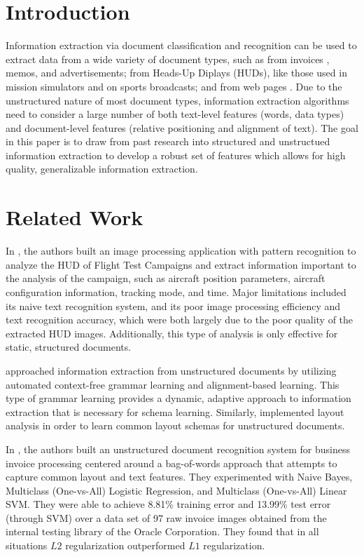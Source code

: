 \documentclass[twoside,11pt]{article}
\renewcommand{\>}{{\rightarrow}}
\newcommand{\1}{{\mathbf 1}}
\newcommand{\0}{{\mathbf 0}}
\begin{document}

\section{Introduction}
Information extraction via document classification and recognition can be used to extract data from a wide variety of document types, such as from invoices \cite{LiuWanZhang2016}, memos, and advertisements; from Heads-Up Diplays (HUDs), like those used in mission simulators \cite{Guarino2013} and on sports broadcasts; and from web pages \cite{Gogar2016}. Due to the unstructured nature of most document types, information extraction algorithms need to consider a large number of both text-level features (words, data types) and document-level features (relative positioning and alignment of text). The goal in this paper is to draw from past research into structured and unstructued information extraction to develop a robust set of features which allows for high quality, generalizable information extraction.


\section{Related Work}
In \cite{Guarino2013}, the authors built an image processing application with pattern recognition to analyze the HUD of Flight Test Campaigns and extract information important to the analysis of the campaign, such as aircraft position parameters, aircraft configuration information, tracking mode, and time. Major limitations included its naive text recognition system, and its poor image processing efficiency and text recognition accuracy, which were both largely due to the poor quality of the extracted HUD images. Additionally, this type of analysis is only effective for static, structured documents.

\cite{Thakur2012} approached information extraction from unstructured documents by utilizing automated context-free grammar learning and alignment-based learning. This type of grammar learning provides a dynamic, adaptive approach to information extraction that is necessary for schema learning. Similarly, \cite{Dejean2015} implemented layout analysis in order to learn common layout schemas for unstructured documents.

In \cite{LiuWanZhang2016}, the authors built an unstructured document recognition system for business invoice processing centered around a bag-of-words approach that attempts to capture common layout and text features. They experimented with Naive Bayes, Multiclass (One-vs-All) Logistic Regression, and Multiclass (One-vs-All) Linear SVM. They were able to achieve 8.81\% training error and 13.99\% test error (through SVM) over a data set of 97 raw invoice images obtained from the internal testing library of the Oracle Corporation. They found that in all situations $L2$ regularization outperformed $L1$ regularization.
\end{document}
